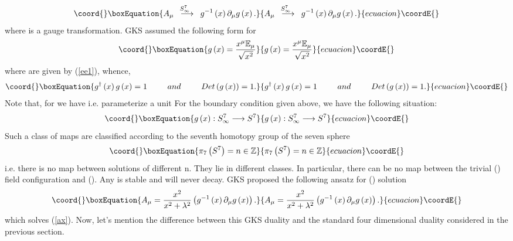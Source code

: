 \documentclass[a4paper,12pt]{book}
\begin{document}
\begin{equation}\coord{}\boxEquation{
A_{\mu }\stackrel{\;\;S_{\infty }^{7}\quad }{\longrightarrow }g^{-1}\left(
x\right) \partial _{\mu }g\left( x\right) .
}{
A_{\mu }\stackrel{\;\;S_{\infty }^{7}\quad }{\longrightarrow }g^{-1}\left(
x\right) \partial _{\mu }g\left( x\right) .
}{ecuacion}\coordE{}\end{equation}
where \coordHE{} is a gauge transformation. GKS assumed the
following form for \coordHE{}%
\begin{equation}\coord{}\boxEquation{
g\left( x\right) =\frac{x^{\mu }\Bbb{E}_{\mu }}{\sqrt{x^{2}}}
}{
g\left( x\right) =\frac{x^{\mu }\Bbb{E}_{\mu }}{\sqrt{x^{2}}}
}{ecuacion}\coordE{}\end{equation}
where \coordHE{} are given by (\ref{ee1}), whence, 
\begin{equation}\coord{}\boxEquation{
g^{\dagger }\left( x\right) g\left( x\right)
=1\;\;\;\;\;\;\;\;\;and\;\;\;\;\;\;\;\;\;Det\left( g\left( x\right) \right)
=1.
}{
g^{\dagger }\left( x\right) g\left( x\right)
=1\;\;\;\;\;\;\;\;\;and\;\;\;\;\;\;\;\;\;Det\left( g\left( x\right) \right)
=1.
}{ecuacion}\coordE{}\end{equation}
Note that, for \coordHE{} we have \coordHE{} i.e. \coordHE{} parameterize a unit \coordHE{} For the boundary condition given above, we have the following
situation: 
\begin{equation}\coord{}\boxEquation{
g\left( x\right) :S_{\infty }^{7}\longrightarrow S^{7}
}{
g\left( x\right) :S_{\infty }^{7}\longrightarrow S^{7}
}{ecuacion}\coordE{}\end{equation}
Such a class of maps are classified according to the seventh homotopy group
of the seven sphere 
\begin{equation}\coord{}\boxEquation{
\pi _{7}\left( S^{7}\right) =n\in \Bbb{Z}
}{
\pi _{7}\left( S^{7}\right) =n\in \Bbb{Z}
}{ecuacion}\coordE{}\end{equation}
i.e. there is no map between solutions of different n. They lie in different
classes. In particular, there can be no map between the trivial \coordHE{} (\coordHE{}) field configuration and \coordHE{} (\coordHE{}). Any \coordHE{}
is stable and will never decay. GKS proposed the following ansatz for \coordHE{} (\coordHE{}) solution 
\begin{equation}\coord{}\boxEquation{
A_{\mu }=\frac{x^{2}}{x^{2}+\lambda ^{2}}\left( g^{-1}\left( x\right)
\partial _{\mu }g\left( x\right) \right) .
}{
A_{\mu }=\frac{x^{2}}{x^{2}+\lambda ^{2}}\left( g^{-1}\left( x\right)
\partial _{\mu }g\left( x\right) \right) .
}{ecuacion}\coordE{}\end{equation}
which solves (\ref{ax}). Now, let's mention the difference between this GKS
duality and the standard four dimensional duality considered in the previous
section.
\end{document}
